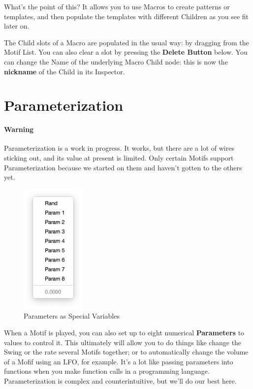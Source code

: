 \documentclass[twoside,10pt]{article}
\begin{document}
What's the point of this?  It allows you to use Macros to create patterns or templates, and then populate the templates with different Children as you see fit later on. 

The Child slots of a Macro are populated in the usual way: by dragging from the Motif List.  You can also clear a slot by pressing the {\bf Delete Button} below.  You can change the Name of the underlying Macro Child node: this is now the {\bf nickname} of the Child in its Inspector.

\clearpage\section{Parameterization}
\label{parameters}

\paragraph{\color{red} Warning}  Parameterization is a work in progress.  It works, but there are a lot of wires sticking out, and its value at present is limited.  Only certain Motifs support Parameterization because we started on them and haven't gotten to the others yet.

\vspace{1em}

\begin{figure}
\vspace{-1em}
\includegraphics[width=1.25in]{params}
\vspace{-2em}
\caption{Parameters as Special Variables}
\label{params}
\end{figure}

When a Motif is played, you can also set up to eight numerical {\bf Parameters} to values to control it.  This ultimately will allow you to do things like change the Swing or the rate several Motifs together; or to automatically change the volume of a Mofif using an LFO, for example.  It's a lot like passing parameters into functions when you make function calls in a programming language.  Parameterization is complex and counterintuitive, but we'll do our best here.
\end{document}
